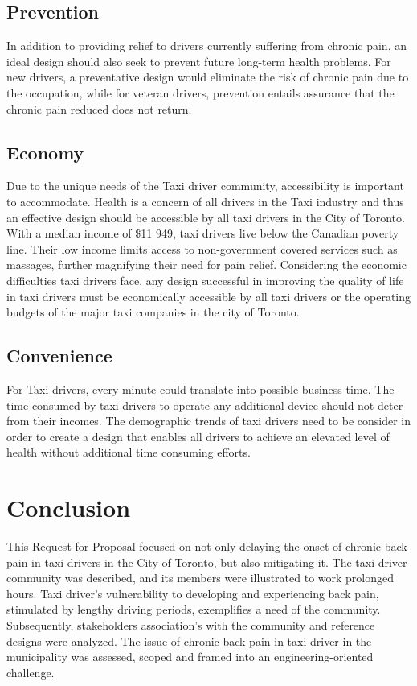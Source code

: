 \documentclass[11pt]{article}
\begin{document}
\subsection{Prevention}
In addition to providing relief to drivers currently suffering from 
chronic pain, an ideal design should also seek to prevent future long-term 
health problems. For new drivers, a preventative design would eliminate
the risk of chronic pain due to the occupation, while for veteran 
drivers, prevention entails assurance that the chronic pain reduced does
not return. 
 
\subsection{Economy}
Due to the unique needs of the Taxi driver community, accessibility is 
important to accommodate. Health is a concern of all drivers in the Taxi 
industry and thus an effective design should be accessible by all taxi 
drivers in the City of Toronto. With a median income of \$11 949, taxi drivers live below the Canadian poverty line\cite{poverty}.    
Their low income limits access to non-government covered services 
such as massages, further magnifying their need for pain relief. 
Considering the economic difficulties taxi drivers face\cite{facey2003health}, any design 
successful in improving the quality of life in taxi drivers must be
economically accessible by all taxi drivers or the operating 
budgets of the major taxi companies in the city of Toronto.

 
\subsection{Convenience}
For Taxi drivers, every minute could translate into possible business 
time\cite{ facey2003health}. The time consumed by taxi drivers to operate 
any additional device should not deter from their incomes. The demographic 
trends of taxi drivers need to be consider in order to create a design 
that enables all drivers to achieve an elevated level of health 
without additional time consuming efforts.

\section{Conclusion}
This Request for Proposal focused on not-only delaying the onset of chronic back pain
in taxi drivers in the City of Toronto, but also mitigating it.  
The taxi driver community was described, and its members were illustrated to work prolonged 
hours\cite{thestar2012, KneePain}. Taxi driver's vulnerability to developing and experiencing 
back pain, stimulated by lengthy driving periods\cite{Okuribido2008, ODrivers@Risk}, 
exemplifies a need of the community. Subsequently, stakeholders association's with the 
community and reference designs were analyzed. The issue of chronic back pain in taxi driver 
in the municipality was assessed, scoped and framed into an engineering-oriented challenge.   
\newpage


\end{document}

